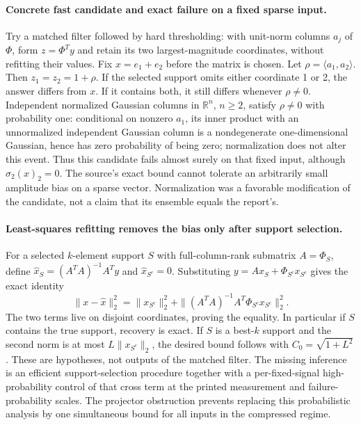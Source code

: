 \documentclass[11pt]{article}
\begin{document}
\paragraph{Concrete fast candidate and exact failure on a fixed sparse input.}
Try a matched filter followed by hard thresholding: with unit-norm columns
$a_j$ of $\Phi$, form $z=\Phi^Ty$ and retain its two largest-magnitude
coordinates, without refitting their values. Fix $x=e_1+e_2$ before the
matrix is chosen. Let $\rho=\langle a_1,a_2\rangle$. Then
$z_1=z_2=1+\rho$. If the selected support omits either coordinate 1 or 2,
the answer differs from $x$. If it contains both, it still differs whenever
$\rho\ne0$. Independent normalized Gaussian columns in $\mathbb R^n$,
$n\ge2$, satisfy $\rho\ne0$ with probability one: conditional on nonzero
$a_1$, its inner product with an unnormalized independent Gaussian column
is a nondegenerate one-dimensional Gaussian, hence has zero probability
of being zero; normalization does not alter this event.
Thus this candidate fails almost surely on that fixed input, although
$\sigma_2(x)_2=0$. The source's exact bound cannot tolerate an arbitrarily
small amplitude bias on a sparse vector. Normalization was a favorable
modification of the candidate, not a claim that its ensemble equals the report's.

\paragraph{Least-squares refitting removes the bias only after support selection.}
For a selected $k$-element support $S$ with full-column-rank submatrix
$A=\Phi_S$, define $\widehat x_S=(A^TA)^{-1}A^Ty$ and
$\widehat x_{S^c}=0$. Substituting
$y=A x_S+\Phi_{S^c}x_{S^c}$ gives the exact identity
\[
\|x-\widehat x\|_2^2
=\|x_{S^c}\|_2^2+
 \|(A^TA)^{-1}A^T\Phi_{S^c}x_{S^c}\|_2^2.
\]
The two terms live on disjoint coordinates, proving the equality. In particular
if $S$ contains the true support, recovery is exact. If $S$ is a best-$k$
support and the second norm is at most $L\|x_{S^c}\|_2$, the desired
bound follows with $C_0=\sqrt{1+L^2}$. These are hypotheses, not outputs
of the matched filter. The missing inference is an efficient support-selection
procedure together with a per-fixed-signal high-probability control of that
cross term at the printed measurement and failure-probability scales.
The projector obstruction prevents replacing this probabilistic analysis by
one simultaneous bound for all inputs in the compressed regime.
\end{document}
